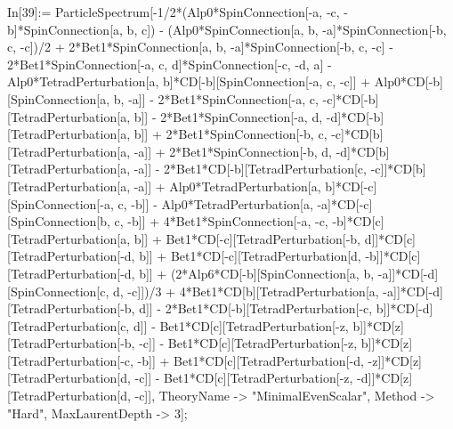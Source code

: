 In[39]:= ParticleSpectrum[-1/2*(Alp0*SpinConnection[-a, -c, -b]*SpinConnection[a, b, c]) - (Alp0*SpinConnection[a, b, -a]*SpinConnection[-b, c, -c])/2 + 2*Bet1*SpinConnection[a, b, -a]*SpinConnection[-b, c, -c] - 2*Bet1*SpinConnection[-a, c, d]*SpinConnection[-c, -d, a] - Alp0*TetradPerturbation[a, b]*CD[-b][SpinConnection[-a, c, -c]] + Alp0*CD[-b][SpinConnection[a, b, -a]] - 2*Bet1*SpinConnection[-a, c, -c]*CD[-b][TetradPerturbation[a, b]] - 2*Bet1*SpinConnection[-a, d, -d]*CD[-b][TetradPerturbation[a, b]] + 2*Bet1*SpinConnection[-b, c, -c]*CD[b][TetradPerturbation[a, -a]] + 2*Bet1*SpinConnection[-b, d, -d]*CD[b][TetradPerturbation[a, -a]] - 2*Bet1*CD[-b][TetradPerturbation[c, -c]]*CD[b][TetradPerturbation[a, -a]] + Alp0*TetradPerturbation[a, b]*CD[-c][SpinConnection[-a, c, -b]] - Alp0*TetradPerturbation[a, -a]*CD[-c][SpinConnection[b, c, -b]] + 4*Bet1*SpinConnection[-a, -c, -b]*CD[c][TetradPerturbation[a, b]] + Bet1*CD[-c][TetradPerturbation[-b, d]]*CD[c][TetradPerturbation[-d, b]] + Bet1*CD[-c][TetradPerturbation[d, -b]]*CD[c][TetradPerturbation[-d, b]] + (2*Alp6*CD[-b][SpinConnection[a, b, -a]]*CD[-d][SpinConnection[c, d, -c]])/3 + 4*Bet1*CD[b][TetradPerturbation[a, -a]]*CD[-d][TetradPerturbation[-b, d]] - 2*Bet1*CD[-b][TetradPerturbation[-c, b]]*CD[-d][TetradPerturbation[c, d]] - Bet1*CD[c][TetradPerturbation[-z, b]]*CD[z][TetradPerturbation[-b, -c]] - Bet1*CD[c][TetradPerturbation[-z, b]]*CD[z][TetradPerturbation[-c, -b]] + Bet1*CD[c][TetradPerturbation[-d, -z]]*CD[z][TetradPerturbation[d, -c]] - Bet1*CD[c][TetradPerturbation[-z, -d]]*CD[z][TetradPerturbation[d, -c]], TheoryName -> "MinimalEvenScalar", Method -> "Hard", MaxLaurentDepth -> 3]; 
